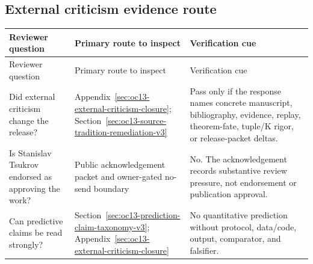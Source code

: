 \subsection{External criticism evidence route}
\label{sec:oc13-reviewer-navigation-external-criticism-v3}

\begin{longtable}{@{}p{}p{}p{}@{}}
\toprule
Reviewer question & Primary route to inspect & Verification cue \\
\midrule
\endfirsthead
\toprule
Reviewer question & Primary route to inspect & Verification cue \\
\midrule
\endhead
Did external criticism change the release? & Appendix~\ref{sec:oc13-external-criticism-closure}; Section~\ref{sec:oc13-source-tradition-remediation-v3} & Pass only if the response names concrete manuscript, bibliography, evidence, replay, theorem-fate, tuple/K rigor, or release-packet deltas. \\
Is Stanislav Tsukrov endorsed as approving the work? & Public acknowledgement packet and owner-gated no-send boundary & No. The acknowledgement records substantive review pressure, not endorsement or publication approval. \\
Can predictive claims be read strongly? & Section~\ref{sec:oc13-prediction-claim-taxonomy-v3}; Appendix~\ref{sec:oc13-external-criticism-closure} & No quantitative prediction without protocol, data/code, output, comparator, and falsifier. \\
\bottomrule
\end{longtable}

\clearpage
